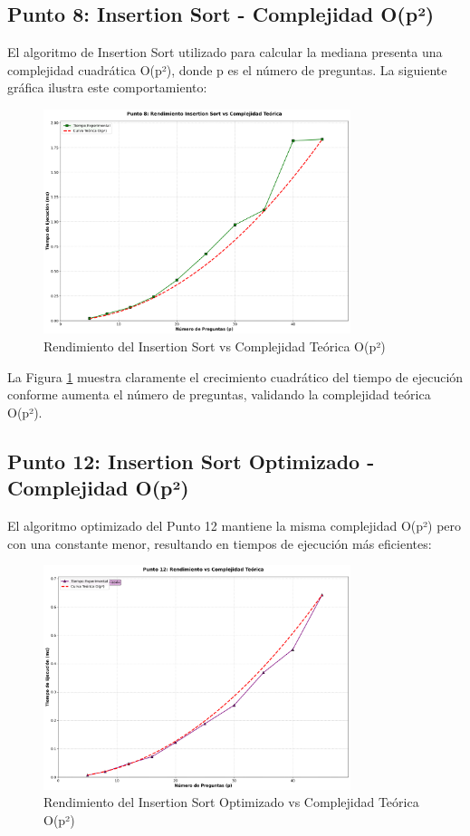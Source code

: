 \subsection{Punto 8: Insertion Sort - Complejidad O(p²)}

El algoritmo de Insertion Sort utilizado para calcular la mediana presenta una complejidad cuadrática O(p²), donde p es el número de preguntas. La siguiente gráfica ilustra este comportamiento:

\begin{figure}[h]
\centering
\includegraphics[width=0.8\textwidth]{grafica_punto8_mejorada.png}
\caption{Rendimiento del Insertion Sort vs Complejidad Teórica O(p²)}
\label{fig:insertion_sort_p8}
\end{figure}

La Figura \ref{fig:insertion_sort_p8} muestra claramente el crecimiento cuadrático del tiempo de ejecución conforme aumenta el número de preguntas, validando la complejidad teórica O(p²).

\subsection{Punto 12: Insertion Sort Optimizado - Complejidad O(p²)}

El algoritmo optimizado del Punto 12 mantiene la misma complejidad O(p²) pero con una constante menor, resultando en tiempos de ejecución más eficientes:

\begin{figure}[h]
\centering
\includegraphics[width=0.8\textwidth]{grafica_punto12_mejorada.png}
\caption{Rendimiento del Insertion Sort Optimizado vs Complejidad Teórica O(p²)}
\label{fig:insertion_sort_p12}
\end{figure}

